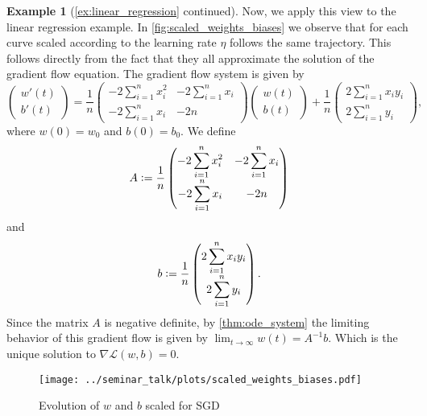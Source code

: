 \documentclass[12pt]{article}
\theoremstyle{definition}
\newtheorem{example}[example]{Example}
\numberwithin{equation}{section}
\newcommand{\CL}{\mathcal{L}}
\newcommand{\defeq}{\vcentcolon=}
\begin{document}
\begin{example}[\autoref{ex:linear_regression} continued]
  Now, we apply this view to the linear regression example. In \autoref{fig:scaled_weights_biases} we observe that for each curve scaled according to the learning rate $\eta$ follows the same trajectory. This follows directly from the fact that they all approximate the solution of the gradient flow equation. The gradient flow system is given by
  \begin{equation*}
    \begin{pmatrix}
      w'(t)      \\
      b'(t)     
  \end{pmatrix}
  = \frac{1}{n}
  \begin{pmatrix}
    -2  \displaystyle\sum_{i=1}^n x_i^2  &  -2  \displaystyle\sum_{i=1}^n x_i      \\
      -2  \displaystyle\sum_{i=1}^n x_i  &  -2n      
  \end{pmatrix}
  \begin{pmatrix}
    w(t)     \\
    b(t)    
  \end{pmatrix}
  + \frac{1}{n}
  \begin{pmatrix}
    2  \displaystyle\sum_{i=1}^n x_i y_i     \\
    2  \displaystyle\sum_{i=1}^n y_i    
  \end{pmatrix},
  \end{equation*}
  where $w(0) = w_{0}$ and $b(0) = b_0$. We define 
  \begin{equation*}
    A \defeq \frac{1}{n}
    \begin{pmatrix}
      -2  \displaystyle\sum_{i=1}^n x_i^2  &  -2  \displaystyle\sum_{i=1}^n x_i      \\
        -2  \displaystyle\sum_{i=1}^n x_i  &  -2n      
    \end{pmatrix}
  \end{equation*}
  and
  \begin{equation*}
    b \defeq
    \frac{1}{n}
  \begin{pmatrix}
    2  \displaystyle\sum_{i=1}^n x_i y_i     \\
    2  \displaystyle\sum_{i=1}^n y_i    
  \end{pmatrix}.
  \end{equation*}
  Since the matrix $A$ is negative definite, by \autoref{thm:ode_system} the limiting behavior of this gradient flow is given by $\lim_{t \rightarrow \infty} w(t) = A^{-1}b$. Which is the unique solution to $\nabla \CL (w,b) = 0$.
  \begin{figure}[htb]
    \centering
    \texttt{[image: ../seminar\_talk/plots/scaled\_weights\_biases.pdf]}
    \caption{Evolution of $w$ and $b$ scaled for SGD}
    \label{fig:scaled_weights_biases}
  \end{figure}
\end{example}
\end{document}

